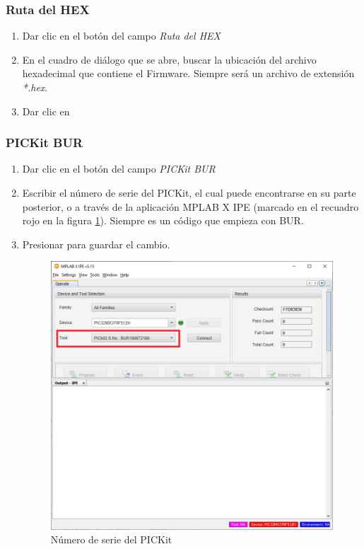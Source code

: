 \documentclass[a4paper,12pt]{refart}
\begin{document}
\subsubsection{Ruta del HEX}
\begin{enumerate}
\item Dar clic en el botón  del campo \emph{Ruta del HEX}
\item En el cuadro de diálogo que se abre, buscar la ubicación del archivo hexadecimal que contiene el Firmware. Siempre será un archivo de extensión \emph{*.hex}.
\item Dar clic en 
\end{enumerate}

\subsubsection{PICKit BUR}
\begin{enumerate}
\item Dar clic en el botón  del campo \emph{PICKit BUR}
\item Escribir el número de serie del PICKit, el cual puede encontrarse en su parte posterior, o a través de la aplicación MPLAB X IPE (marcado en el recuadro rojo en la figura \ref{fig:pickitBur}). Siempre es un código que empieza con BUR.
\item Presionar \keys{\enter} para guardar el cambio.

\begin{figure}[hbt!]\centering
\includegraphics[width=\textwidth, frame]{images/pickit_bur} 
\caption{Número de serie del PICKit}
\label{fig:pickitBur}
\end{figure}

\end{enumerate}
\end{document}
